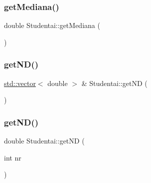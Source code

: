 \mbox{\label{class_studentai_a84ac1c18fb51c7c486df8a1f7360c156}} 
\subsubsection{\texorpdfstring{getMediana()}{getMediana()}}
{\footnotesize\ttfamily double Studentai\+::get\+Mediana (\begin{DoxyParamCaption}{ }\end{DoxyParamCaption})\hspace{0.3cm}{\ttfamily [inline]}}

\mbox{\label{class_studentai_af78d09bf07faaf71bd442559b751068d}} 
\subsubsection{\texorpdfstring{getND()}{getND()}\hspace{0.1cm}{\footnotesize\ttfamily [1/2]}}
{\footnotesize\ttfamily \mbox{\hyperlink{vector_8cpp_a428a4ddfbed4c2db0ef58ecfffdccf8d}{std\+::vector}}$<$ double $>$ \& Studentai\+::get\+ND (\begin{DoxyParamCaption}{ }\end{DoxyParamCaption})}

\mbox{\label{class_studentai_a3bc596569b26bf9673c772f844fbc756}} 
\subsubsection{\texorpdfstring{getND()}{getND()}\hspace{0.1cm}{\footnotesize\ttfamily [2/2]}}
{\footnotesize\ttfamily double Studentai\+::get\+ND (\begin{DoxyParamCaption}\item[{int}]{nr }\end{DoxyParamCaption})}

\mbox{\label{class_studentai_a5b971c5bfd9e3ec4ba7cd7aa1ab31db5}} 

